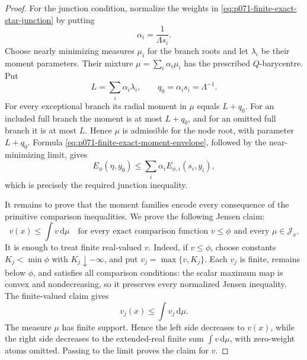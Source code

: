 \begin{proof}
For the junction condition, normalize the weights in
\eqref{eq:p071-finite-exact-star-junction} by putting
\[
                       \alpha_i=\frac1{\Lambda s_i}.
\]
Choose nearly minimizing measures \(\mu_i\) for the branch roots and let
\(\lambda_i\) be their moment parameters.  Their mixture
\(\mu=\sum_i\alpha_i\mu_i\) has the prescribed \(Q\)-barycentre.  Put
\[
                  L=\sum_i\alpha_i\lambda_i,
                  \qquad q_0=\alpha_i s_i=\Lambda^{-1}.
\]
For every exceptional branch its radial moment in \(\mu\) equals
\(L+q_0\).  For an included full branch the moment is at most \(L+q_0\),
and for an omitted full branch it is at most \(L\).  Hence \(\mu\) is
admissible for the node root, with parameter \(L+q_0\).  Formula
\eqref{eq:p071-finite-exact-moment-envelope}, followed by the
near-minimizing limit, gives
\[
                   E_\phi(\eta,y_0)
                      \leq\sum_i\alpha_iE_{\phi,i}(s_i,y_i),
\]
which is precisely the required junction inequality.

It remains to prove that the moment families encode every consequence of
the primitive comparison inequalities.  We prove the following Jensen
claim:
\begin{equation}
             v(x)\leq\int v\,\mathrm d\mu
 \quad\text{for every exact comparison function \(v\leq\phi\) and
 every \(\mu\in\mathcal J_x\).}
 \label{eq:p071-finite-exact-jensen-claim}
\end{equation}
It is enough to treat finite real-valued $v$.  Indeed, if $v\leq\phi$,
choose constants $K_j<\min\phi$ with $K_j\downarrow-\infty$, and put
$v_j=\max\{v,K_j\}$.  Each $v_j$ is finite, remains below $\phi$,
and satisfies all comparison conditions: the scalar maximum map is convex
and nondecreasing, so it preserves every normalized Jensen inequality.
The finite-valued claim gives
\[
                         v_j(x)\leq\int v_j\,\mathrm d\mu.
\]
The measure $\mu$ has finite support.  Hence the left side decreases to
$v(x)$, while the right side decreases to the extended-real finite sum
$\int v\,\mathrm d\mu$, with zero-weight atoms omitted.  Passing to the
limit proves the claim for $v$.


\end{proof}
